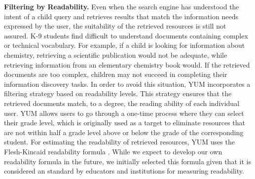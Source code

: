 \documentclass{sig-alternate-05-2015}
\begin{document}
\noindent
\textbf{Filtering by Readability.} Even when the search engine has understood the intent of a child query and retrieves results that match the information needs expressed by the user, the suitability of the retrieved resources is still not assured.  K-9 students find difficult to understand documents containing complex or technical vocabulary. For example, if a child is looking for information about chemistry, retrieving a scientific publication would not be adequate, while retrieving information from an elementary chemistry book would. If the retrieved documents are too complex, children may not succeed in completing their information discovery tasks. In order to avoid this situation, YUM incorporates a filtering strategy based on readability levels. This strategy ensures that the retrieved documents match, to a degree, the reading ability of each individual user. YUM allows users to go through a one-time process where they can select their grade level, which is originally used as a target to eliminate resources that are not within half a grade level above or below the grade of the corresponding student. For estimating the readability of retrieved resources, YUM uses the Flesh-Kincaid readability formula \cite{Fle48}. While we expect to develop our own readability formula in the future, we initially selected this formula given that it is considered an standard by educators and institutions for measuring readability.  
\end{document}
